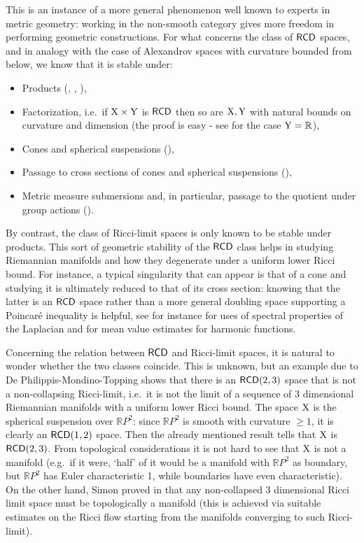 \documentclass[11pt]{article}
\numberwithin{equation}{section}
\newcommand{\R}{\mathbb{R}}
\newcommand{\X}{{\rm X}}
\newcommand{\Y}{{\rm Y}}
\newcommand{\RCD}{{\sf RCD}}
\begin{document}
This is an instance of a more general phenomenon well known to experts in metric geometry: working in the non-smooth category gives more freedom in performing geometric constructions. For what concerns the class of $\RCD$ spaces, and in analogy with the case of Alexandrov spaces with curvature bounded from below, we know that it is stable under:
\begin{itemize}
\item[a)] Products (\cite{AmbrosioGigliSavare12}, \cite{Erbar-Kuwada-Sturm13}, \cite{AmbrosioMondinoSavare13}),
\item[b)] Factorization, i.e.\ if $\X\times\Y$ is $\RCD$ then so are $\X,\Y$ with natural bounds on curvature and dimension (the proof is easy - see \cite{Gigli13} for the case $\Y=\R$),
\item[a')] Cones and spherical suspensions (\cite{Ketterer13}),
\item[b')] Passage to cross sections of cones and spherical suspensions (\cite{Ketterer13}),
\item[c)] Metric measure submersions and, in particular, passage to the quotient under group actions (\cite{GKMS17}).
\end{itemize}
By contrast, the class of Ricci-limit spaces is only known to be stable under products. This sort of geometric stability of the $\RCD$ class helps in studying Riemannian manifolds and how they degenerate under a uniform lower Ricci bound. For instance, a typical singularity that can appear is that of a cone and studying it is ultimately reduced to that of its cross section: knowing that the latter is an $\RCD$ space rather than a more general doubling space supporting a Poincar\'e inequality is helpful, see for instance \cite[Sections 4.10 and 7.3]{ChJiNa21} for uses of spectral properties of the Laplacian and \cite[Claim 5]{ChNa15} for mean value estimates for harmonic functions. 

Concerning the relation between $\RCD$ and Ricci-limit spaces, it is natural to wonder whether the two classes coincide. This is unknown, but an example due to De Philippis-Mondino-Topping shows that there is an $\RCD(2,3)$ space that is not a non-collapsing Ricci-limit, i.e.\ it is not the limit of a sequence of 3 dimensional Riemannian manifolds with a uniform lower Ricci bound. The space $\X$ is the spherical suspension over $\R P^2$: since $\R P^2$ is smooth with curvature $\geq1$, it is clearly an $\RCD(1,2)$ space. Then the already mentioned result  \cite{Ketterer13} tells that $\X$  is $\RCD(2,3)$. From topological considerations it is not hard to see that $\X$ is not a manifold (e.g.\ if it were, `half' of it would be a manifold with $\R P^2$ as boundary, but $\R P^2$ has Euler characteristic 1, while boundaries have even characteristic). On the other hand, Simon proved in \cite{Simon12} that any non-collapsed 3 dimensional Ricci limit space must be topologically a manifold (this is achieved via suitable estimates on the Ricci flow starting from the manifolds converging to such Ricci-limit).
\end{document}
